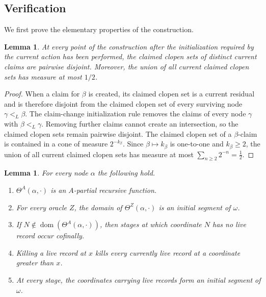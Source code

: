 \documentclass[10pt,a4paper]{amsart}
\newtheorem{lemma}[theorem]{Lemma}
\begin{document}
\subsection{Verification}

We first prove the elementary properties of the construction. 

\begin{lemma}\label{low2:claim-separation}
At every point of the construction after the initialization required by the
current action has been performed, the claimed clopen sets of distinct
current claims are pairwise disjoint. Moreover, the union of all current
claimed clopen sets has measure at most $1/2$.
\end{lemma}

\begin{proof}
When a claim for $\beta$ is created, its claimed clopen set is a current
residual and is therefore disjoint from the claimed clopen set of every
surviving node $\gamma<_L\beta$. The claim-change initialization rule removes
the claims of every node $\gamma$ with $\beta<_L\gamma$. Removing further
claims cannot create an intersection, so the claimed clopen sets remain
pairwise disjoint.
The claimed clopen set of a $\beta$-claim is contained in a cone of measure
$2^{-k_\beta}$. Since $\beta\mapsto k_\beta$ is one-to-one and
$k_\beta\geq2$, the union of all current claimed clopen sets has measure at
most $\sum_{n\geq2}2^{-n}=\frac12$.
\end{proof}

\begin{lemma}\label{low2:ordered-search-facts}
For every node $\alpha$ the following hold.
\begin{enumerate}[label=(\roman*)]
\item $\Theta^A(\alpha,\cdot)$ is an $A$-partial recursive function.
\item For every oracle $Z$, the domain of $\Theta^Z(\alpha,\cdot)$ is an
      initial segment of $\omega$.
\item If $N\notin\operatorname{dom}(\Theta^A(\alpha,\cdot))$, then stages at
      which coordinate $N$ has no live record occur cofinally.
\item Killing a live record at $x$ kills every currently live record at a
      coordinate greater than $x$.
\item At every stage, the coordinates carrying live records form an initial
      segment of $\omega$.
\end{enumerate}
\end{lemma}
\end{document}
